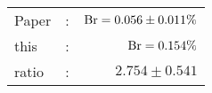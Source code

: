       \begin{tabular}{lcr}
          Paper &:& $\mathrm{Br}  = 0.056\pm 0.011\%$ \\
          this      &:& $\mathrm{Br}  = 0.154\%$ \\
		  ratio   &:& $2.754\pm 0.541$ \\
      \end{tabular}
